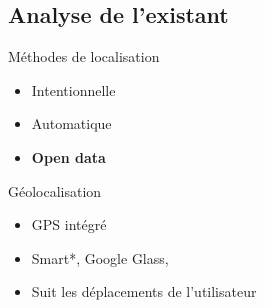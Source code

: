 \documentclass{beamer} %
\begin{document}
  \subsection{Analyse de l'existant}
  \begin{frame}{\subsecname}
    \begin{block}{Méthodes de localisation}
      \begin{itemize}
        \item Intentionnelle
        \item Automatique
        \item \textbf{Open data}
      \end{itemize}  
    \end{block}
    
    \begin{block}{Géolocalisation}
      \begin{itemize}
        \item GPS intégré
        \item Smart*, Google Glass, 
        \item Suit les déplacements de l'utilisateur
      \end{itemize}
    \end{block}
    
  \end{frame}
\end{document}
